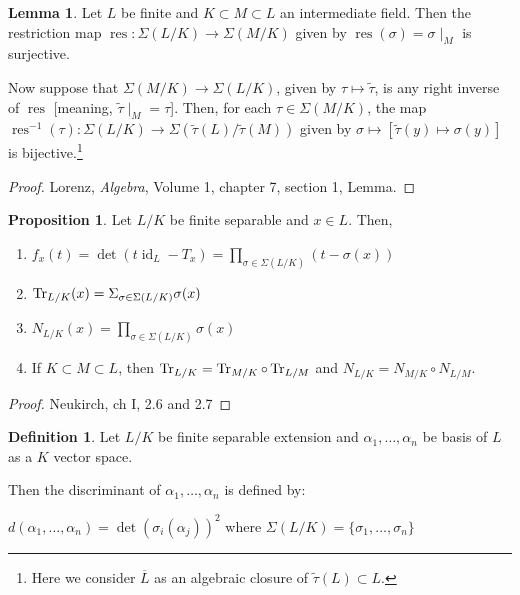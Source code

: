 \documentclass[openany]{amsbook}
\numberwithin{section}{chapter}
\theoremstyle{definition}
\newtheorem*{definition}{Definition}
\newtheorem{proposition}[theorem]{Proposition}
\newtheorem{lemma}[theorem]{Lemma}
\newcommand{\id}{\operatorname{id}}
\begin{document}
\begin{lemma}
Let \(L \) be finite and \(K \subset M \subset L\) an intermediate field. Then the restriction map \(\operatorname{res} : \Sigma (L / K) \to \Sigma (M / K)\) given by \(\operatorname{res}(\sigma) = \sigma \mid_M\)  is surjective.

Now suppose that \(\Sigma (M / K) \to \Sigma (L / K)\), given by \(\tau \mapsto \tilde{\tau}\), is any right inverse of \(\operatorname{res}\) [meaning, \(\tilde{\tau } \mid _M = \tau\)]. Then, for each \(\tau \in \Sigma(M / K)\), the map \(\operatorname{res}^{-1} (\tau) : \Sigma (L / K) \to \Sigma (\tilde{\tau}(L) / \tilde{\tau}(M))\) given by \(\sigma \mapsto [\tilde{\tau}(y) \mapsto \sigma(y)]\)  is bijective.\footnote{Here we consider \(\overline{L}\) as an algebraic closure of \(\tilde{\tau}(L) \subset L\).}
\end{lemma}

\begin{proof}
    Lorenz, \emph{Algebra}, Volume 1, chapter 7, section 1, Lemma.
\end{proof}

\begin{proposition}
    Let \(L / K\) be finite separable and \(x\in L\). Then,
    
    \begin{enumerate}[label=\roman*)]
        \item  \(f_x(t) = \det (t \id_L - T_x) = \prod_{\sigma \in \Sigma (L / K)}^{}(t - \sigma(x)) \)
        
        \item \(\Tr_{L / K}(x) = \Sigma_{\sigma \in \Sigma (L / K)} \sigma(x)\) 
        
        \item \(N_{L / K}(x) = \prod_{\sigma \in \Sigma (L / K)} \sigma (x)\) 
        
        \item If \(K \subset M \subset L\), then \(\Tr_{L / K} = \Tr_{M / K} \circ \Tr_{L / M}\) and \(N_{L / K} = N_{M / K} \circ N_{L / M}\). 

    \end{enumerate}  

\end{proposition}

\begin{proof}
    Neukirch, ch I, 2.6 and 2.7
\end{proof}

\begin{definition}
    Let \(L /K\) be finite separable extension and \(\alpha_1, \dots , \alpha_n\) be basis of \(L\) as a \(K\) vector space.

    Then the discriminant of \(\alpha_1, \dots ,\alpha_n\) is defined by:

    \(d(\alpha_1, \dots , \alpha_n) = \det(\sigma_i(\alpha_j))^2\) where \(\Sigma (L / K) = \{ \sigma_1, \dots , \sigma_n \} \) 
\end{definition}
\end{document}
